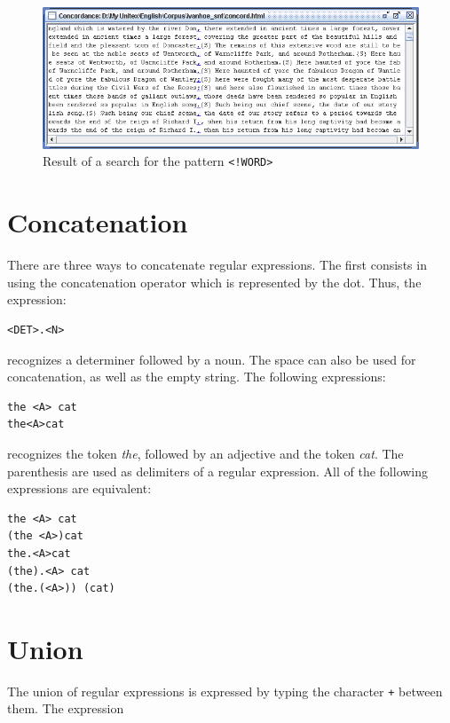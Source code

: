 \bigskip
\begin{figure}[!ht]
\begin{center}
\includegraphics[width=15cm]{resources/img/fig4-2.png}
\caption{Result of a search for the pattern
\texttt{<!WORD>}\label{fig-search-<!WORD>}}
\end{center}
\end{figure}

\section{Concatenation}
There are three ways to concatenate regular expressions. The first consists in
using the concatenation operator which is represented by the dot.
Thus, the expression:

\begin{verbatim}
<DET>.<N>
\end{verbatim}

\noindent recognizes a determiner followed by a noun. The space can also be used for
concatenation, as well as the empty string. The following expressions:

\begin{verbatim}
the <A> cat
the<A>cat
\end{verbatim}

\noindent recognizes the token \textit{the}, followed by an adjective and the
token \textit{cat}. The parenthesis
 are used as delimiters of a regular expression.  All of the
following expressions are equivalent:

\begin{verbatim}
the <A> cat
(the <A>)cat
the.<A>cat
(the).<A> cat
(the.(<A>)) (cat)
\end{verbatim}

\section{Union}
\index{\verbc{+}}
The union of regular expressions is expressed by typing the character \verb$+$
between them. The expression

